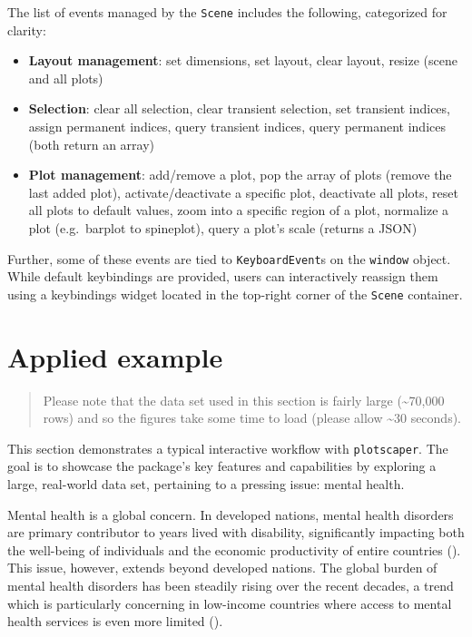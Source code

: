 \documentclass[
  openany]{book}
\providecommand{\tightlist}{%
  \setlength{\itemsep}{0pt}\setlength{\parskip}{0pt}}
\theoremstyle{definition}
\theoremstyle{definition}
\theoremstyle{definition}
\theoremstyle{definition}
\theoremstyle{remark}
\begin{document}
The list of events managed by the \texttt{Scene} includes the following, categorized for clarity:

\begin{itemize}
\tightlist
\item
  \textbf{Layout management}: set dimensions, set layout, clear layout, resize (scene and all plots)
\item
  \textbf{Selection}: clear all selection, clear transient selection, set transient indices, assign permanent indices, query transient indices, query permanent indices (both return an array)
\item
  \textbf{Plot management}: add/remove a plot, pop the array of plots (remove the last added plot), activate/deactivate a specific plot, deactivate all plots, reset all plots to default values, zoom into a specific region of a plot, normalize a plot (e.g.~barplot to spineplot), query a plot's scale (returns a JSON)
\end{itemize}

Further, some of these events are tied to \texttt{KeyboardEvent}s on the \texttt{window} object. While default keybindings are provided, users can interactively reassign them using a keybindings widget located in the top-right corner of the \texttt{Scene} container.

\chapter{Applied example}\label{applied-example}

\begin{quote}
Please note that the data set used in this section is fairly large (\textasciitilde70,000 rows) and so the figures take some time to load (please allow \textasciitilde30 seconds).
\end{quote}

This section demonstrates a typical interactive workflow with \texttt{plotscaper}. The goal is to showcase the package's key features and capabilities by exploring a large, real-world data set, pertaining to a pressing issue: mental health.

Mental health is a global concern. In developed nations, mental health disorders are primary contributor to years lived with disability, significantly impacting both the well-being of individuals and the economic productivity of entire countries (). This issue, however, extends beyond developed nations. The global burden of mental health disorders has been steadily rising over the recent decades, a trend which is particularly concerning in low-income countries where access to mental health services is even more limited ().
\end{document}
